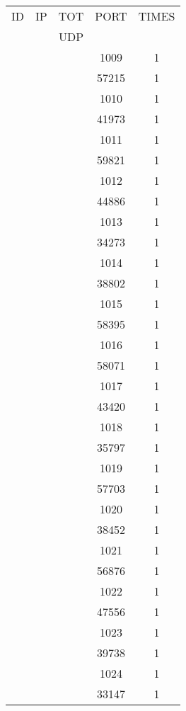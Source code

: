 \documentclass[a4paper]{scrartcl}
\begin{document}
\begin{minipage}[b]{0.5\linewidth}
\begin{tabular}{| c | c | c | c | c |}
\hline
ID & IP & TOT & PORT & TIMES \\ 
   &    & UDP &      &       \\ 
\hline
& & & 1009 & 1 \\ & & & 57215 & 1 \\ & & & 1010 & 1 \\ & & & 41973 & 1 \\ & & & 1011 & 1 \\ & & & 59821 & 1 \\ & & & 1012 & 1 \\ & & & 44886 & 1 \\ & & & 1013 & 1 \\ & & & 34273 & 1 \\ & & & 1014 & 1 \\ & & & 38802 & 1 \\ & & & 1015 & 1 \\ & & & 58395 & 1 \\ & & & 1016 & 1 \\ & & & 58071 & 1 \\ & & & 1017 & 1 \\ & & & 43420 & 1 \\ & & & 1018 & 1 \\ & & & 35797 & 1 \\ & & & 1019 & 1 \\ & & & 57703 & 1 \\ & & & 1020 & 1 \\ & & & 38452 & 1 \\ & & & 1021 & 1 \\ & & & 56876 & 1 \\ & & & 1022 & 1 \\ & & & 47556 & 1 \\ & & & 1023 & 1 \\ & & & 39738 & 1 \\ & & & 1024 & 1 \\ & & & 33147 & 1 \\ \hline
\end{tabular}
\end{minipage}\hfill
\end{document}
